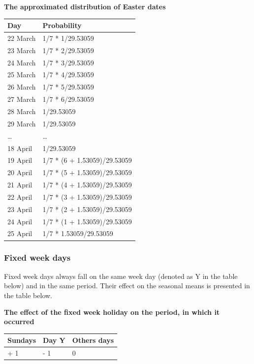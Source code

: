 \documentclass[
  letterpaper,
  DIV=11,
  numbers=noendperiod]{scrreprt}
\begin{document}
\textbf{The approximated distribution of Easter dates}

\begin{longtable}[]{@{}ll@{}}
\toprule()
\textbf{Day} & \textbf{Probability} \\
\midrule()
\endhead
22 March & 1/7 * 1/29.53059 \\
23 March & 1/7 * 2/29.53059 \\
24 March & 1/7 * 3/29.53059 \\
25 March & 1/7 * 4/29.53059 \\
26 March & 1/7 * 5/29.53059 \\
27 March & 1/7 * 6/29.53059 \\
28 March & 1/29.53059 \\
29 March & 1/29.53059 \\
\ldots{} & \ldots{} \\
18 April & 1/29.53059 \\
19 April & 1/7 * (6 + 1.53059)/29.53059 \\
20 April & 1/7 * (5 + 1.53059)/29.53059 \\
21 April & 1/7 * (4 + 1.53059)/29.53059 \\
22 April & 1/7 * (3 + 1.53059)/29.53059 \\
23 April & 1/7 * (2 + 1.53059)/29.53059 \\
24 April & 1/7 * (1 + 1.53059)/29.53059 \\
25 April & 1/7 * 1.53059/29.53059 \\
\bottomrule()
\end{longtable}

\hypertarget{fixed-week-days}{%
\subsubsection{Fixed week days}\label{fixed-week-days}}

Fixed week days always fall on the same week day (denoted as Y in the
table below) and in the same period. Their effect on the seasonal means
is presented in the table below.

\textbf{The effect of the fixed week holiday on the period, in which it
occurred}

\begin{longtable}[]{@{}lll@{}}
\toprule()
\textbf{Sundays} & \textbf{Day Y} & \textbf{Others days} \\
\midrule()
\endhead
+ 1 & - 1 & 0 \\
\bottomrule()
\end{longtable}
\end{document}
